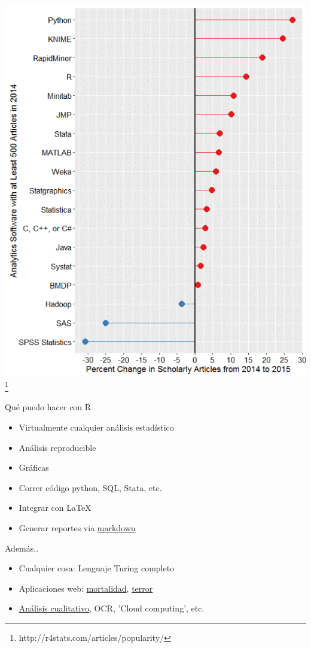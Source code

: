 \documentclass{beamer}
\begin{document}
\begin{frame}
      \includegraphics[scale=0.4]{change}\footnote{http://r4stats.com/articles/popularity/}
\end{frame}

\begin{frame}{Qu\'e puedo hacer con R}
     \begin{itemize}
	  \item Virtualmente cualquier an\'alisis estad\'istico
      \item An\'alisis reproducible
      \item Gr\'aficas
      \item Correr c\'odigo python, SQL, Stata, etc.
      \item Integrar con \LaTeX
      \item Generar reportes via \textcolor{blue}{\hyperlink{hhttp://rmarkdown.rstudio.com/}{markdown}}
     \end{itemize}
Adem\'as..
     \begin{itemize}
      \item Cualquier cosa: Lenguaje Turing completo
	  \item Aplicaciones web: \textcolor{blue}{\hyperlink{https://jschoeley.shinyapps.io/hmdexp/}{mortalidad}}, \textcolor{blue}{\hyperlink{https://haschke.shinyapps.io/PTS-App/}{terror}}
	  \item \textcolor{blue}{\hyperlink{rqda.r-forge.r-project.org/}{An\'alisis cualitativo}}, OCR, 'Cloud computing', etc.
      \end{itemize}
  \end{frame}
\end{document}

